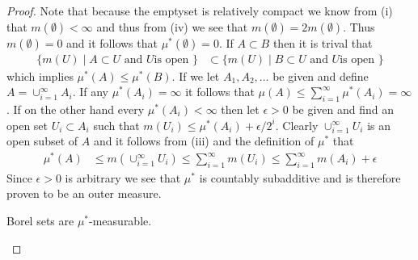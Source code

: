 \begin{proof}
Note that because the emptyset is relatively compact we know from (i)
that $m(\emptyset) < \infty$ and thus from (iv) we see that
$m(\emptyset) = 2m(\emptyset)$.  Thus $m(\emptyset) = 0$ and it
follows that $\mu^*(\emptyset) = 0$.  If $A \subset B$ then it is
trival that 
\begin{align*}
\lbrace m(U) \mid A \subset U \text{ and $U$
  is open } \rbrace &\subset \lbrace m(U) \mid B \subset U \text{ and $U$
  is open } \rbrace
\end{align*}
which implies $\mu^*(A) \leq \mu^*(B)$.  If we let $A_1, A_2, \dotsc$
be given and define $A = \cup_{i=1}^\infty A_i$.  If any
$\mu^*(A_i) = \infty$ it follows that $\mu(A) \leq \sum_{i=1}^\infty
\mu^*(A_i) = \infty$.  If on the other hand every $\mu^*(A_i) <
\infty$ then let $\epsilon > 0$ be given and find an open set $U_i
\subset A_i$ such that $m(U_i) \leq \mu^*(A_i) + \epsilon / 2^i$.
Clearly $\cup_{i=1}^\infty U_i$ is an open subset of $A$ and it
follows from (iii) and the definition of $\mu^*$ that
\begin{align*}
\mu^*(A) &\leq m(\cup_{i=1}^\infty U_i) \leq \sum_{i=1}^\infty m(U_i)
\leq \sum_{i=1}^\infty m(A_i) + \epsilon
\end{align*}
Since $\epsilon > 0$ is arbitrary we see that $\mu^*$ is countably
subadditive and is therefore proven to be an outer measure.

\begin{clm}Borel sets are $\mu^*$-measurable.
\end{clm}


\end{proof}
